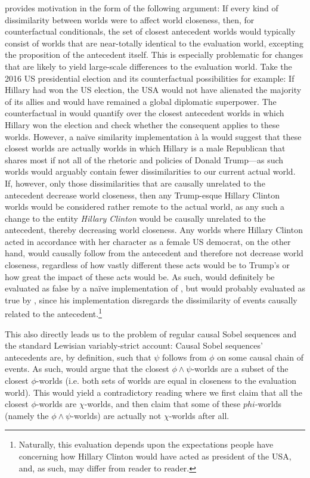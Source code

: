 \textcite{Bennett2003} provides motivation in the form of the following argument: If every kind of dissimilarity between worlds were to affect world closeness, then, for counterfactual conditionals, the set of closest antecedent worlds would typically consist of worlds that are near-totally identical to the evaluation world, excepting the proposition of the antecedent itself. This is especially problematic for changes that are likely to yield large-scale differences to the evaluation world. Take the 2016 US presidential election and its counterfactual possibilities for example:\vskip -2.25mm
\ex{}If Hillary had won the US election, the USA would not have alienated the majority of its allies and would have remained a global diplomatic superpower.\xe\vskip -2.25mm
\noindent The counterfactual in  would quantify over the closest antecedent worlds in which Hillary won the election and check whether the consequent applies to these worlds. However, a na\"ive similarity implementation \`a la \textcite{Lewis1973} would suggest that these closest worlds are actually worlds in which Hillary is a male Republican that shares most if not all of the rhetoric and policies of Donald Trump---as such worlds would arguably contain fewer dissimilarities to our current actual world. If, however, only those dissimilarities that are causally unrelated to the antecedent decrease world closeness, then any Trump-esque Hillary Clinton worlds would be considered rather remote to the actual world, as any such a change to the entity \textit{Hillary Clinton} would be causally unrelated to the antecedent, thereby decreasing world closeness. Any worlds where Hillary Clinton acted in accordance with her character as a female US democrat, on the other hand, would causally follow from the antecedent and therefore not decrease world closeness, regardless of how vastly different these acts would be to Trump's or how great the impact of these acts would be. As such,  would definitely be evaluated as false by a na\"ive implementation of \textcite{Lewis1973}, but would probably evaluated as true by \textcite{Bennett2003}, since his implementation disregards the dissimilarity of events causally related to the antecedent.\footnote{Naturally, this evaluation depends upon the expectations people have concerning how Hillary Clinton would have acted as president of the USA, and, as such, may differ from reader to reader.}

This also directly leads us to the problem of regular causal Sobel sequences and the standard Lewisian variably-strict account: Causal Sobel sequences' antecedents are, by definition, such that $\psi$ follows from $\phi$ on some causal chain of events. As such, \textcite{Bennett2003} would argue that the closest $\phi\land\psi$-worlds are a subset of the closest $\phi$-worlds (i.e. both sets of worlds are equal in closeness to the evaluation world). This would yield a contradictory reading where we first claim that all the closest $\phi$-worlds are $\chi$-worlds, and then claim that some of these $phi$-worlds (namely the $\phi\land\psi$-worlds) are actually not $\chi$-worlds after all. 

